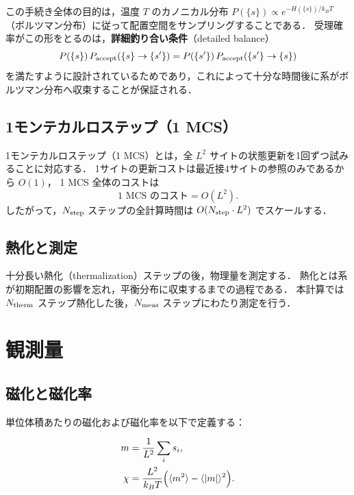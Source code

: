 \documentclass[12pt,a4paper]{ltjsarticle}
\begin{document}
この手続き全体の目的は，温度 $T$ のカノニカル分布
$P(\{s\}) \propto e^{-H(\{s\})/k_BT}$（ボルツマン分布）に従って配置空間をサンプリングすることである．
受理確率がこの形をとるのは，\textbf{詳細釣り合い条件}（detailed balance）
\begin{equation}
  P(\{s\})\, P_{\rm accept}(\{s\}\to\{s'\})
  = P(\{s'\})\, P_{\rm accept}(\{s'\}\to\{s\})
\end{equation}
を満たすように設計されているためであり，これによって十分な時間後に系がボルツマン分布へ収束することが保証される．

\subsection{1モンテカルロステップ（1 MCS）}

1モンテカルロステップ（1 MCS）とは，全 $L^2$ サイトの状態更新を1回ずつ試みることに対応する．
1サイトの更新コストは最近接4サイトの参照のみであるから $O(1)$，
1 MCS 全体のコストは
\begin{equation}
  \text{1 MCS のコスト} = O(L^2).
\end{equation}
したがって，$N_{\rm step}$ ステップの全計算時間は $O(N_{\rm step} \cdot L^2)$ でスケールする．

\subsection{熱化と測定}

十分長い熱化（thermalization）ステップの後，物理量を測定する．
熱化とは系が初期配置の影響を忘れ，平衡分布に収束するまでの過程である．
本計算では $N_{\rm therm}$ ステップ熱化した後，$N_{\rm meas}$ ステップにわたり測定を行う．

\section{観測量}

\subsection{磁化と磁化率}

単位体積あたりの磁化および磁化率を以下で定義する：

\begin{align}
  m &= \frac{1}{L^2} \sum_{i} s_i, \\
  \chi &= \frac{L^2}{k_B T}\Bigl(\langle m^2 \rangle - \langle |m| \rangle^2\Bigr).
\end{align}
\end{document}
